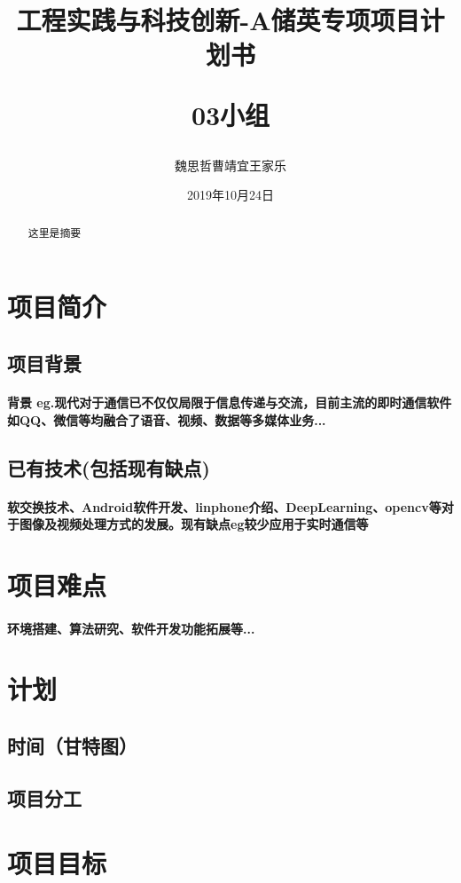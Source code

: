 \documentclass[12pt]{extarticle}
\title{工程实践与科技创新\Romannum{3}-A储英专项项目计划书\\
\begin{large}
    03小组
\end{large}}
\author{魏思哲\quad 曹靖宜\quad 王家乐}
\date{2019年10月24日}
\newcommand{\<}{\langle}
\renewcommand{\>}{\rangle}
\theoremstyle{definition}
\begin{document}
\maketitle
\renewcommand{\contentsname}{目录}
\tableofcontents
\newpage
\begin{abstract}
    这里是摘要
\end{abstract}
\section{项目简介}
\subsection{项目背景}
\paragraph{背景 eg.现代对于通信已不仅仅局限于信息传递与交流，目前主流的即时通信软件如QQ、微信等均融合了语音、视频、数据等多媒体业务...}
\subsection{已有技术(包括现有缺点)}
\paragraph{软交换技术、Android软件开发、linphone介绍、DeepLearning、opencv等对于图像及视频处理方式的发展。现有缺点eg较少应用于实时通信等}

\section{项目难点}
\paragraph{环境搭建、算法研究、软件开发功能拓展等...}

\section{计划}
\subsection{时间（甘特图）}
\subsection{项目分工}


\section{项目目标}
\end{document}

